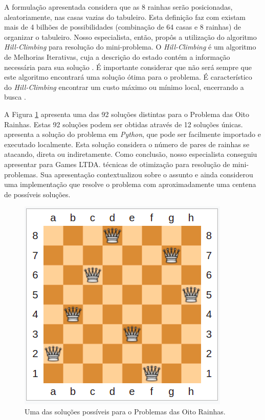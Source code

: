 
A formulação apresentada considera que as 8 rainhas serão posicionadas, aleatoriamente, nas casas vazias do tabuleiro. Esta definição faz com existam mais de 4 bilhões de possibilidades (combinação de 64 casas e 8 rainhas) de organizar o tabuleiro. Nosso especialista, então, propôs a utilização do algoritmo \textit{Hill-Climbing} para resolução do mini-problema. O \textit{Hill-Climbing} é um algoritmo de Melhorias Iterativas, cuja a descrição do estado contém a informação necessária para sua solução \cite{gent1993towards}. É importante considerar que não será sempre que este algoritmo encontrará uma solução ótima para o problema. É característico do \textit{Hill-Climbing} encontrar um custo máximo ou mínimo local, encerrando a busca \cite{selman2006hill}. 


A Figura \ref{fig:myfig} apresenta uma das 92 soluções distintas para o Problema das Oito Rainhas. Estas 92 soluções podem ser obtidas através de 12 soluções únicas. \cite{Moura2018} apresenta a solução do problema em \textit{Python}, que pode ser facilmente importado e executado localmente. Esta solução considera o número de pares de rainhas se atacando, direta ou indiretamente. Como conclusão, nosso especialista conseguiu apresentar para Games LTDA. técnicas de otimização para resolução de mini-problemas. Sua apresentação contextualizou sobre o assunto e ainda considerou uma implementação que resolve o problema com aproximadamente uma centena de possíveis soluções.

\begin{figure}[h]
    \includegraphics[scale=0.5]{fig/8queens.png}
    \centering
    \caption{Uma das soluções possíveis para o Problemas das Oito Rainhas.}
    \label{fig:myfig}
\end{figure}